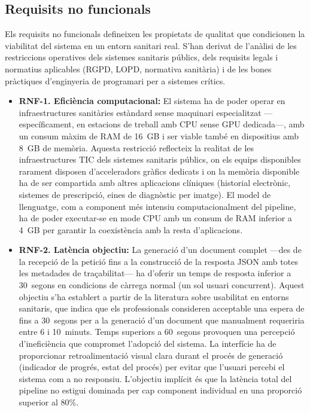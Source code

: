 \documentclass[CAT]{TFUOC}%
\begin{document}
\subsection{Requisits no funcionals}

Els requisits no funcionals defineixen les propietats de qualitat que condicionen la viabilitat del sistema en un entorn sanitari real. S'han derivat de l'anàlisi de les restriccions operatives dels sistemes sanitaris públics, dels requisits legals i normatius aplicables (RGPD, LOPD, normativa sanitària) i de les bones pràctiques d'enginyeria de programari per a sistemes crítics.

\begin{itemize}
    \item \textbf{RNF-1. Eficiència computacional:} El sistema ha de poder operar en infraestructures sanitàries estàndard sense maquinari especialitzat ---específicament, en estacions de treball amb CPU sense GPU dedicada---, amb un consum màxim de RAM de 16~GB i ser viable també en dispositius amb 8~GB de memòria. Aquesta restricció reflecteix la realitat de les infraestructures TIC dels sistemes sanitaris públics, on els equips disponibles rarament disposen d'acceleradors gràfics dedicats i on la memòria disponible ha de ser compartida amb altres aplicacions clíniques (historial electrònic, sistemes de prescripció, eines de diagnòstic per imatge). El model de llenguatge, com a component més intensiu computacionalment del pipeline, ha de poder executar-se en mode CPU amb un consum de RAM inferior a 4~GB per garantir la coexistència amb la resta d'aplicacions.

    \item \textbf{RNF-2. Latència objectiu:} La generació d'un document complet ---des de la recepció de la petició fins a la construcció de la resposta JSON amb totes les metadades de traçabilitat--- ha d'oferir un temps de resposta inferior a 30~segons en condicions de càrrega normal (un sol usuari concurrent). Aquest objectiu s'ha establert a partir de la literatura sobre usabilitat en entorns sanitaris, que indica que els professionals consideren acceptable una espera de fins a 30~segons per a la generació d'un document que manualment requeriria entre 6 i 10~minuts. Temps superiors a 60~segons provoquen una percepció d'ineficiència que compromet l'adopció del sistema. La interfície ha de proporcionar retroalimentació visual clara durant el procés de generació (indicador de progrés, estat del procés) per evitar que l'usuari percebi el sistema com a no responsiu. L'objectiu implícit és que la latència total del pipeline no estigui dominada per cap component individual en una proporció superior al 80\%.


\end{itemize}
\end{document}
